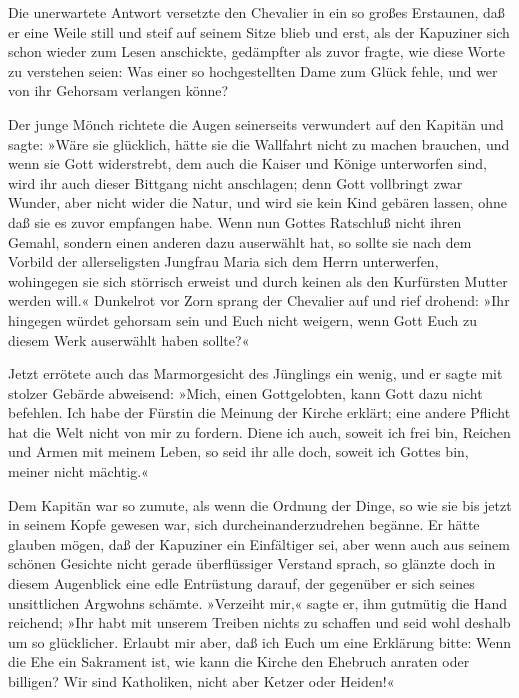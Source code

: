 \pagenum{[112]}Die unerwartete Antwort versetzte den Chevalier in
ein so großes Erstaunen, daß er eine Weile still und steif auf
seinem Sitze blieb und erst, als der Kapuziner sich schon wieder
zum Lesen anschickte, gedämpfter als zuvor fragte, wie diese Worte
zu verstehen seien: Was einer so hochgestellten Dame zum Glück
fehle, und wer von ihr Gehorsam verlangen könne?

Der junge Mönch richtete die Augen seinerseits verwundert auf den
Kapitän und sagte: »Wäre sie glücklich, hätte sie die Wallfahrt
nicht zu machen brauchen, und wenn sie Gott widerstrebt, dem auch
die Kaiser und Könige unterworfen sind, wird ihr auch dieser
Bittgang nicht anschlagen; denn Gott vollbringt zwar Wunder, aber
nicht wider die Natur, und wird sie kein Kind gebären lassen, ohne
daß sie es zuvor empfangen habe. Wenn nun Gottes Ratschluß nicht
ihren Gemahl, sondern einen anderen dazu auserwählt hat, so sollte
sie nach dem Vorbild der allerseligsten Jungfrau Maria sich dem
Herrn unterwerfen, wohingegen sie sich störrisch erweist und durch
keinen als den Kurfürsten Mutter werden will.« Dunkelrot vor Zorn
sprang der Chevalier auf und rief drohend: »Ihr hingegen würdet
gehorsam sein und Euch nicht weigern, wenn Gott Euch zu diesem Werk
auserwählt haben sollte?«

Jetzt errötete auch das Marmorgesicht des Jünglings ein wenig, und
er sagte mit stolzer Gebärde abweisend: »Mich, einen Gottgelobten,
kann Gott dazu nicht befehlen. Ich habe der Fürstin die Meinung der
Kirche erklärt; eine andere Pflicht hat die Welt nicht von mir zu
fordern. Diene ich auch, soweit ich frei bin, Reichen und Armen mit
meinem Leben, so seid ihr alle doch, soweit ich Gottes bin, meiner
nicht mächtig.«

\pagenum{[113]}Dem Kapitän war so zumute, als wenn die Ordnung der
Dinge, so wie sie bis jetzt in seinem Kopfe gewesen war, sich
durcheinanderzudrehen begänne. Er hätte glauben mögen, daß der
Kapuziner ein Einfältiger sei, aber wenn auch aus seinem schönen
Gesichte nicht gerade überflüssiger Verstand sprach, so glänzte
doch in diesem Augenblick eine edle Entrüstung darauf, der
gegenüber er sich seines unsittlichen Argwohns schämte. »Verzeiht
mir,« sagte er, ihm gutmütig die Hand reichend; »Ihr habt mit
unserem Treiben nichts zu schaffen und seid wohl deshalb um so
glücklicher. Erlaubt mir aber, daß ich Euch um eine Erklärung
bitte: Wenn die Ehe ein Sakrament ist, wie kann die Kirche den
Ehebruch anraten oder billigen? Wir sind Katholiken, nicht aber
Ketzer oder Heiden!«

